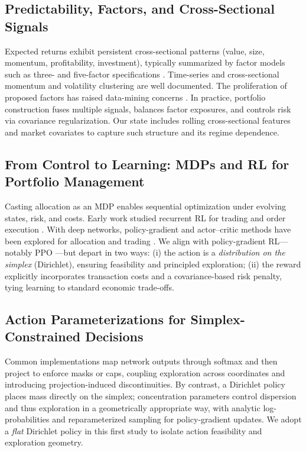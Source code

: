 \documentclass[10pt,leqno]{amsart}
\begin{document}
\subsection{Predictability, Factors, and Cross-Sectional Signals}
Expected returns exhibit persistent cross-sectional patterns (value, size, momentum, profitability, investment), typically summarized by factor models such as three- and five-factor specifications \cite{fama1993common,fama2015five}. Time-series and cross-sectional momentum \cite{jegadeesh1993returns} and volatility clustering \cite{bollerslev1986generalized} are well documented. The proliferation of proposed factors has raised data-mining concerns \cite{harvey2016and}. In practice, portfolio construction fuses multiple signals, balances factor exposures, and controls risk via covariance regularization. Our state includes rolling cross-sectional features and market covariates to capture such structure and its regime dependence.

\subsection{From Control to Learning: MDPs and RL for Portfolio Management}
Casting allocation as an MDP enables sequential optimization under evolving states, risk, and costs. Early work studied recurrent RL for trading \cite{moody2001learning} and order execution \cite{nevmyvaka2006reinforcement}. With deep networks, policy-gradient and actor–critic methods have been explored for allocation and trading \cite{deng2016deep,jiang2017deep,yang2020deep,zhang2020finrl}. We align with policy-gradient RL—notably PPO \cite{schulman2017proximal}—but depart in two ways: (i) the action is a \emph{distribution on the simplex} (Dirichlet), ensuring feasibility and principled exploration; (ii) the reward explicitly incorporates transaction costs and a covariance-based risk penalty, tying learning to standard economic trade-offs.

\subsection{Action Parameterizations for Simplex-Constrained Decisions}
Common implementations map network outputs through softmax and then project to enforce masks or caps, coupling exploration across coordinates and introducing projection-induced discontinuities. By contrast, a Dirichlet policy places mass directly on the simplex; concentration parameters control dispersion and thus exploration in a geometrically appropriate way, with analytic log-probabilities and reparameterized sampling for policy-gradient updates. We adopt a \emph{flat} Dirichlet policy in this first study to isolate action feasibility and exploration geometry.
\end{document}
